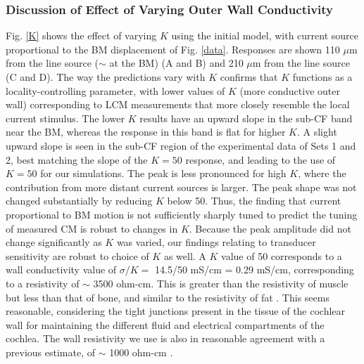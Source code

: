 \documentclass{biophys-new}
\begin{document}
\subsubsection{Discussion of Effect of Varying Outer Wall Conductivity}
\par{Fig. \ref{K} shows the effect of varying $K$ using the initial model, with current source proportional to the BM displacement of Fig. \ref{data}.  Responses are shown 110 $\mu$m from the line source ($\sim$ at the BM) (A and B) and 210 $\mu$m from the line source (C and D). The way the predictions vary with $K$ confirms that $K$ functions as a locality-controlling parameter, with lower values of $K$ (more conductive outer wall) corresponding to LCM measurements that more closely resemble the local current stimulus. The lower $K$ results have an upward slope in the sub-CF band near the BM, whereas the response in this band is flat for higher $K$.  A slight upward slope is seen in the sub-CF region of the experimental data of Sets 1 and 2, best matching the slope of the $K=50$ response, and leading to the use of $K=50$ for our simulations. The peak is less pronounced for high $K$, where the contribution from more distant current sources is larger.  The peak shape was not changed substantially by reducing $K$ below 50. Thus, the finding that current proportional to BM motion is not sufficiently sharply tuned to predict the tuning of measured CM is robust to changes in $K$. Because the peak amplitude did not change significantly as $K$ was varied, our findings relating to transducer sensitivity are robust to choice of $K$ as well.  A $K$ value of 50 corresponds to a wall conductivity value of  $\sigma/K =$ 14.5/50 mS/cm = 0.29 mS/cm, corresponding to a resistivity of $\sim$ 3500 ohm-cm. This is greater than the resistivity of muscle but less than that of bone, and similar to the resistivity of fat \cite{faes}. This seems reasonable, considering the tight junctions present in the tissue of the cochlear wall for maintaining the different fluid and electrical compartments of the cochlea. The wall resistivity we use is also in reasonable agreement with a previous estimate, of $\sim$ 1000 ohm-cm \cite{misrahy}.}
\end{document}
